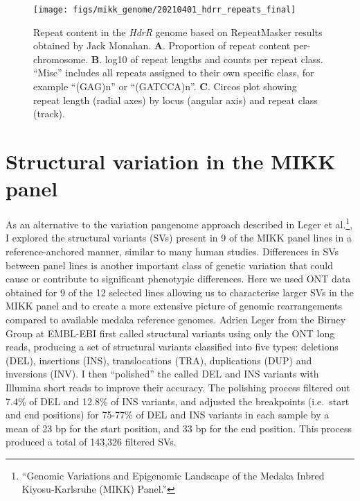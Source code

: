 \documentclass[
  9pt,
]{book}
\begin{document}
\begin{figure}
\texttt{[image: figs/mikk\_genome/20210401\_hdrr\_repeats\_final]} \caption{Repeat content in the \emph{HdrR} genome based on RepeatMasker results obtained by Jack Monahan. \textbf{A}. Proportion of repeat content per-chromosome. \textbf{B}. log10 of repeat lengths and counts per repeat class. ``Misc'' includes all repeats assigned to their own specific class, for example ``(GAG)n'' or ``(GATCCA)n''. \textbf{C}. Circos plot showing repeat length (radial axes) by locus (angular axis) and repeat class (track).}\label{fig:repeats}
\end{figure}

\hypertarget{mikksv-sec}{%
\section{Structural variation in the MIKK panel}\label{mikksv-sec}}

As an alternative to the variation pangenome approach described in Leger et al.\footnote{{``Genomic Variations and Epigenomic Landscape of the {Medaka Inbred Kiyosu-Karlsruhe} ({MIKK}) Panel.''}}, I explored the structural variants (SVs) present in 9 of the MIKK panel lines in a reference-anchored manner, similar to many human studies. Differences in SVs between panel lines is another important class of genetic variation that could cause or contribute to significant phenotypic differences. Here we used ONT data obtained for 9 of the 12 selected lines allowing us to characterise larger SVs in the MIKK panel and to create a more extensive picture of genomic rearrangements compared to available medaka reference genomes. Adrien Leger from the Birney Group at EMBL-EBI first called structural variants using only the ONT long reads, producing a set of structural variants classified into five types: deletions (DEL), insertions (INS), translocations (TRA), duplications (DUP) and inversions (INV). I then ``polished'' the called DEL and INS variants with Illumina short reads to improve their accuracy. The polishing process filtered out 7.4\% of DEL and 12.8\% of INS variants, and adjusted the breakpoints (i.e.~start and end positions) for 75-77\% of DEL and INS variants in each sample by a mean of 23 bp for the start position, and 33 bp for the end position. This process produced a total of 143,326 filtered SVs.
\end{document}
